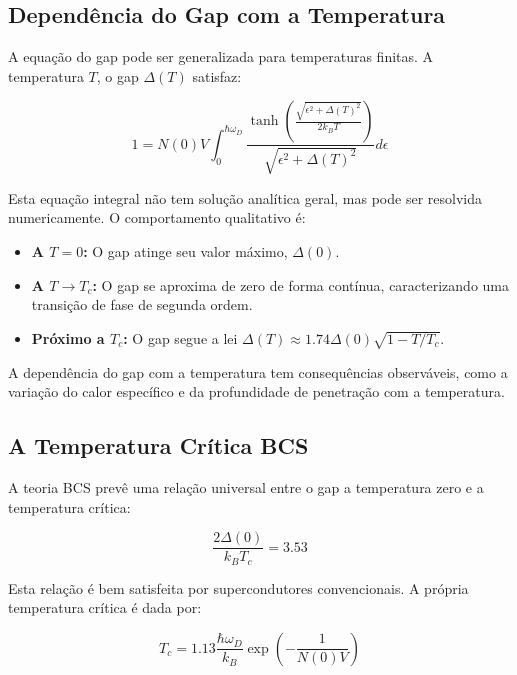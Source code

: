 \documentclass[12pt, a4paper, oneside]{report}
\begin{document}
\subsection{Dependência do Gap com a Temperatura}

A equação do gap pode ser generalizada para temperaturas finitas. A temperatura $T$, o gap $\Delta(T)$ satisfaz:

\begin{equation}
    1 = N(0)V \int_0^{\hbar \omega_D} \frac{\tanh\left(\frac{\sqrt{\epsilon^2 + \Delta(T)^2}}{2k_B T}\right)}{\sqrt{\epsilon^2 + \Delta(T)^2}} d\epsilon
\end{equation}

Esta equação integral não tem solução analítica geral, mas pode ser resolvida numericamente. O comportamento qualitativo é:

\begin{itemize}
    \item \textbf{A $T = 0$:} O gap atinge seu valor máximo, $\Delta(0)$.
    \item \textbf{A $T \to T_c$:} O gap se aproxima de zero de forma contínua, caracterizando uma transição de fase de segunda ordem.
    \item \textbf{Próximo a $T_c$:} O gap segue a lei $\Delta(T) \approx 1.74 \Delta(0) \sqrt{1 - T/T_c}$.
\end{itemize}

A dependência do gap com a temperatura tem consequências observáveis, como a variação do calor específico e da profundidade de penetração com a temperatura.

\subsection{A Temperatura Crítica BCS}

A teoria BCS prevê uma relação universal entre o gap a temperatura zero e a temperatura crítica:

\begin{equation}
    \frac{2\Delta(0)}{k_B T_c} = 3.53
\end{equation}

Esta relação é bem satisfeita por supercondutores convencionais. A própria temperatura crítica é dada por:

\begin{equation}
    T_c = 1.13 \frac{\hbar \omega_D}{k_B} \exp\left(-\frac{1}{N(0)V}\right)
\end{equation}
\end{document}
